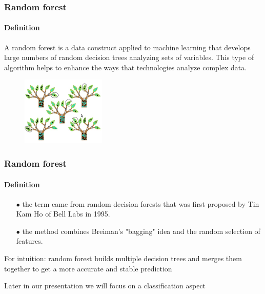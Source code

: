 \begin{frame}
	\frametitle{Random forest}
		\framesubtitle{Definition}

	\begin{block}{}
		A random forest is a data construct applied to machine learning that develops large numbers of random decision trees analyzing sets of variables. This type of algorithm helps to enhance the ways that technologies analyze complex data.
	\end{block}

	\vfill
	
	\begin{figure}
		\includegraphics[width=4cm]{./figures/las}
	\end{figure}

\end{frame}

\begin{frame}
	\frametitle{Random forest}
		\framesubtitle{Definition}

		\begin{itemize}
		  \item[$\bullet$]  the term came from random decision forests that was first proposed by Tin Kam Ho of Bell Labs in 1995.
		  \item[$\bullet$] the method combines Breiman's "bagging" idea and the random selection of features.
		\end{itemize}
		
		\vfill
		
		For intuition:
		random forest builds multiple decision trees and merges them together to get a more accurate and stable prediction

		\vfill

		\tiny Later in our presentation we will focus on a classification aspect

\end{frame}

